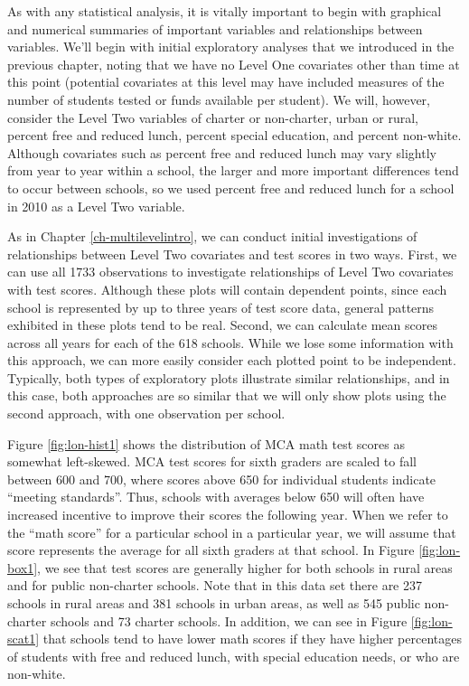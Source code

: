 \documentclass[
]{krantz}
\begin{document}
As with any statistical analysis, it is vitally important to begin with graphical and numerical summaries of important variables and relationships between variables. We'll begin with initial exploratory analyses that we introduced in the previous chapter, noting that we have no Level One covariates other than time at this point (potential covariates at this level may have included measures of the number of students tested or funds available per student). We will, however, consider the Level Two variables of charter or non-charter, urban or rural, percent free and reduced lunch, percent special education, and percent non-white. Although covariates such as percent free and reduced lunch may vary slightly from year to year within a school, the larger and more important differences tend to occur between schools, so we used percent free and reduced lunch for a school in 2010 as a Level Two variable.

As in Chapter \ref{ch-multilevelintro}, we can conduct initial investigations of relationships between Level Two covariates and test scores in two ways. First, we can use all 1733 observations to investigate relationships of Level Two covariates with test scores. Although these plots will contain dependent points, since each school is represented by up to three years of test score data, general patterns exhibited in these plots tend to be real. Second, we can calculate mean scores across all years for each of the 618 schools. While we lose some information with this approach, we can more easily consider each plotted point to be independent. Typically, both types of exploratory plots illustrate similar relationships, and in this case, both approaches are so similar that we will only show plots using the second approach, with one observation per school.

Figure \ref{fig:lon-hist1} shows the distribution of MCA math test scores as somewhat left-skewed. MCA test scores for sixth graders are scaled to fall between 600 and 700, where scores above 650 for individual students indicate ``meeting standards''. Thus, schools with averages below 650 will often have increased incentive to improve their scores the following year. When we refer to the ``math score'' for a particular school in a particular year, we will assume that score represents the average for all sixth graders at that school. In Figure \ref{fig:lon-box1}, we see that test scores are generally higher for both schools in rural areas and for public non-charter schools. Note that in this data set there are 237 schools in rural areas and 381 schools in urban areas, as well as 545 public non-charter schools and 73 charter schools. In addition, we can see in Figure \ref{fig:lon-scat1} that schools tend to have lower math scores if they have higher percentages of students with free and reduced lunch, with special education needs, or who are non-white.
\end{document}
